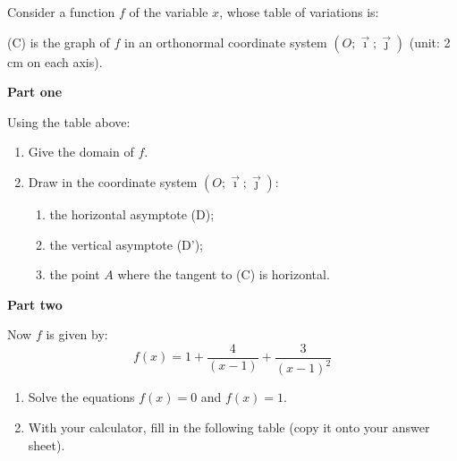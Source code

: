 \begin{tkzexample}
Consider a function $f$ of the variable $x$, whose table of variations is:

\begin{center}
\end{center}

 \vspace{6pt}
(C) is the graph of $f$ in an orthonormal coordinate system%
 $(O;\vec{\imath};\vec{\jmath})$ (unit: 2 cm on each axis).%

\textbf{Part one}

Using the table above:%

 \begin{enumerate}
 \item  Give the domain of $f$.
 \item  Draw in the coordinate system $(O;\vec{\imath};\vec{\jmath})$:
 \begin{enumerate}
 \item  the horizontal asymptote (D);
 \item  the vertical asymptote (D');
 \item  the point $A$ where the tangent to (C) is horizontal.
 \end{enumerate}
 \end{enumerate}

\textbf{Part two}

Now $f$ is given by:
\[
f(x)=1 + \dfrac{4}{(x-1)}    + \dfrac{3}{(x-1)^2}
\]
\begin{enumerate}
 \item Solve the equations $f(x)=0$ and $f(x)=1$.
 \item  With your calculator, fill in the following table
  (copy it onto your answer sheet).
\end{enumerate}

\vfill
\end{tkzexample}

